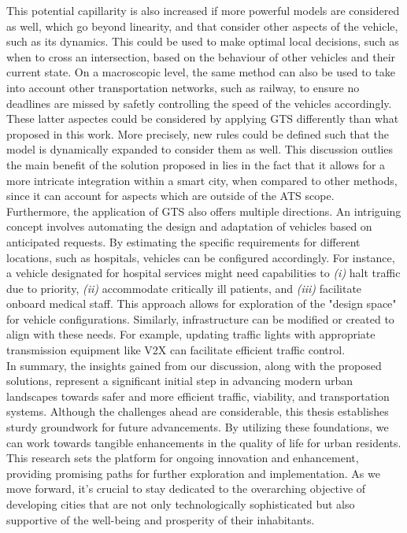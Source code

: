 This potential capillarity is also increased if more powerful models are considered as well, which go beyond linearity, and that consider other aspects of the vehicle, such as its dynamics. This could be used to make optimal local decisions, such as when to cross an intersection, based on the behaviour of other vehicles and their current state. On a macroscopic level, the same method can also be used to take into account other transportation networks, such as railway, to ensure no deadlines are missed by safetly controlling the speed of the vehicles accordingly. These latter aspectes could be considered by applying GTS differently than what proposed in this work. More precisely, new rules could be defined such that the model is dynamically expanded to consider them as well. This discussion outlies the main benefit of the solution proposed in  lies in the fact that it allows for a more intricate integration within a smart city, when compared to other methods, since it can account for aspects which are outside of the ATS scope.\\
 Furthermore, the application of GTS also offers multiple directions. An intriguing concept involves automating the design and adaptation of vehicles based on anticipated requests. By estimating the specific requirements for different locations, such as hospitals, vehicles can be configured accordingly. For instance, a vehicle designated for hospital services might need capabilities to \textit{(i)} halt traffic due to priority, \textit{(ii)} accommodate critically ill patients, and \textit{(iii)} facilitate onboard medical staff. This approach allows for exploration of the "design space" for vehicle configurations. Similarly, infrastructure can be modified or created to align with these needs. For example, updating traffic lights with appropriate transmission equipment like V2X can facilitate efficient traffic control. \\
In summary, the insights gained from our discussion, along with the proposed solutions, represent a significant initial step in advancing modern urban landscapes towards safer and more efficient traffic, viability, and transportation systems. Although the challenges ahead are considerable, this thesis establishes sturdy groundwork for future advancements. By utilizing these foundations, we can work towards tangible enhancements in the quality of life for urban residents. This research sets the platform for ongoing innovation and enhancement, providing promising paths for further exploration and implementation. As we move forward, it's crucial to stay dedicated to the overarching objective of developing cities that are not only technologically sophisticated but also supportive of the well-being and prosperity of their inhabitants.